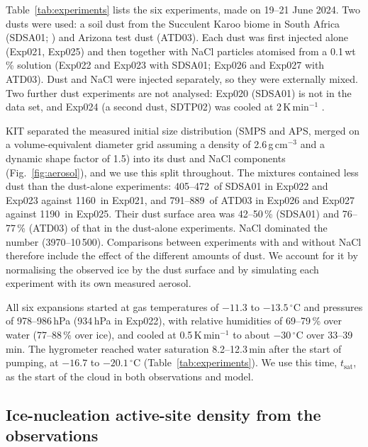 Table~\ref{tab:experiments} lists the six experiments, made on 19--21 June 2024. Two dusts were used: a soil dust from the Succulent Karoo biome in South Africa (SDSA01; \citealp{Bazo2026})  and Arizona test dust (ATD03). Each dust was first injected alone (Exp021, Exp025) and then together with NaCl particles atomised from a 0.1\,wt\,\% solution (Exp022 and Exp023 with SDSA01; Exp026 and Exp027 with ATD03). Dust and NaCl were injected separately, so they were externally mixed. Two further dust experiments are not analysed: Exp020 (SDSA01) is not in the data set, and Exp024 (a second dust, SDTP02) was cooled at 2\,K\,min$^{-1}$ .

KIT separated the measured initial size distribution (SMPS and APS, merged on a volume-equivalent diameter grid assuming a density of 2.6\,g\,cm$^{-3}$ and a dynamic shape factor of 1.5) into its dust and NaCl components (Fig.~\ref{fig:aerosol}), and we use this split throughout. The mixtures contained less dust than the dust-alone experiments: 405--472\cmc\ of SDSA01 in Exp022 and Exp023 against 1160\cmc\ in Exp021, and 791--889\cmc\ of ATD03 in Exp026 and Exp027 against 1190\cmc\ in Exp025. Their dust surface area was 42--50\,\% (SDSA01) and 76--77\,\% (ATD03) of that in the dust-alone experiments. NaCl dominated the number (3970--10\,500\cmc). Comparisons between experiments with and without NaCl therefore include the effect of the different amounts of dust. We account for it by normalising the observed ice by the dust surface and by simulating each experiment with its own measured aerosol.

All six expansions started at gas temperatures of $-11.3$ to $-13.5\,^\circ$C and pressures of 978--986\,hPa (934\,hPa in Exp022), with relative humidities of 69--79\,\% over water (77--88\,\% over ice), and cooled at 0.5\,K\,min$^{-1}$ to about $-30\,^\circ$C over 33--39\,min. The hygrometer reached water saturation 8.2--12.3\,min after the start of pumping, at $-16.7$ to $-20.1\,^\circ$C (Table~\ref{tab:experiments}). We use this time, $t_\mathrm{sat}$, as the start of the cloud in both observations and model.

\subsection{Ice-nucleation active-site density from the observations}\label{sec:ns}


